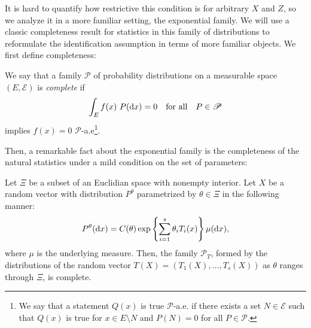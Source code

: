 It is hard to quantify how restrictive this condition is for arbitrary $ X $ and $ Z $, so we analyze it in a more familiar setting, the exponential family.
We will use a classic completeness result for statistics in this family of distributions to reformulate the identification assumption in terms of more familiar objects.
We first define completeness:
\begin{deff}
    \cite{lehmann59} We say that a family $ \mathscr{P} $ of probability distributions on a measurable space $ ( E, \mathcal{E} ) $ is \emph{complete} if
    \begin{equation*}
        \int_{ E } f ( x ) \ P ( \mathrm{d} x ) = 0 \quad \text{for all} \quad P \in \mathscr{P}
    \end{equation*}
    implies $ f ( x ) = 0 $ $ \mathscr{P} $-a.e\footnote{We say that a statement $ Q ( x ) $ is true $ \mathscr{P} $-a.e. if there exists a set $ N \in \mathcal{E} $ such that $ Q ( x ) $ is true for $ x \in E \setminus N $ and $ P ( N ) = 0 $ for all $ P \in \mathscr{P} $.}.
\end{deff}
Then, a remarkable fact about the exponential family is the completeness of the natural statistics under a mild condition on the set of parameters:
\begin{thm}
    \label{thm: completeness of exp family}
    \cite{lehmann59} Let $ \Xi $ be a subset of an Euclidian space with nonempty interior.
    Let $ X $ be a random vector with distribution $ P^{ \theta } $ parametrized by $ \theta \in \Xi $ in the following manner:
    \begin{equation*}
        P^{ \theta } ( \mathrm{d} x ) = C ( \theta ) \exp \left\{ \sum_{ i=1 }^{ s } \theta_{ i } T_{ i } ( x ) \right\} \mu ( \mathrm{d} x )
    ,\end{equation*}
    where $ \mu $ is the underlying measure.
    Then, the family $ \mathscr{P}_{ T } $, formed by the distributions of the random vector $ T ( X ) = ( T_{ 1 } ( X ), \dots, T_{ s } ( X ) ) $ as $ \theta $ ranges through $ \Xi $, is complete.
\end{thm}

